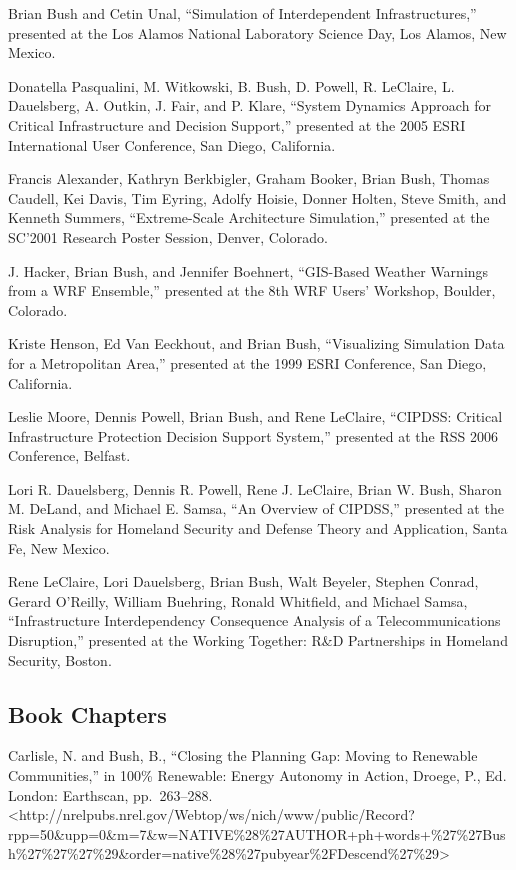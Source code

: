 \documentclass[]{article}
\begin{document}
Brian Bush and Cetin Unal, ``Simulation of Interdependent
Infrastructures,'' presented at the Los Alamos National Laboratory
Science Day, Los Alamos, New Mexico.

Donatella Pasqualini, M. Witkowski, B. Bush, D. Powell, R. LeClaire, L.
Dauelsberg, A. Outkin, J. Fair, and P. Klare, ``System Dynamics Approach
for Critical Infrastructure and Decision Support,'' presented at the
2005 ESRI International User Conference, San Diego, California.

Francis Alexander, Kathryn Berkbigler, Graham Booker, Brian Bush, Thomas
Caudell, Kei Davis, Tim Eyring, Adolfy Hoisie, Donner Holten, Steve
Smith, and Kenneth Summers, ``Extreme-Scale Architecture Simulation,''
presented at the SC'2001 Research Poster Session, Denver, Colorado.

J. Hacker, Brian Bush, and Jennifer Boehnert, ``GIS-Based Weather
Warnings from a WRF Ensemble,'' presented at the 8th WRF Users'
Workshop, Boulder, Colorado.

Kriste Henson, Ed Van Eeckhout, and Brian Bush, ``Visualizing Simulation
Data for a Metropolitan Area,'' presented at the 1999 ESRI Conference,
San Diego, California.

Leslie Moore, Dennis Powell, Brian Bush, and Rene LeClaire, ``CIPDSS:
Critical Infrastructure Protection Decision Support System,'' presented
at the RSS 2006 Conference, Belfast.

Lori R. Dauelsberg, Dennis R. Powell, Rene J. LeClaire, Brian W. Bush,
Sharon M. DeLand, and Michael E. Samsa, ``An Overview of CIPDSS,''
presented at the Risk Analysis for Homeland Security and Defense Theory
and Application, Santa Fe, New Mexico.

Rene LeClaire, Lori Dauelsberg, Brian Bush, Walt Beyeler, Stephen
Conrad, Gerard O'Reilly, William Buehring, Ronald Whitfield, and Michael
Samsa, ``Infrastructure Interdependency Consequence Analysis of a
Telecommunications Disruption,'' presented at the Working Together: R\&D
Partnerships in Homeland Security, Boston.

\subsection{Book Chapters}\label{book-chapters}

Carlisle, N. and Bush, B., ``Closing the Planning Gap: Moving to
Renewable Communities,'' in 100\% Renewable: Energy Autonomy in Action,
Droege, P., Ed. London: Earthscan, pp.~263--288.
\textless{}http://nrelpubs.nrel.gov/Webtop/ws/nich/www/public/Record?rpp=50\&upp=0\&m=7\&w=NATIVE\%28\%27AUTHOR+ph+words+\%27\%27Bush\%27\%27\%27\%29\&order=native\%28\%27pubyear\%2FDescend\%27\%29\textgreater{}
\end{document}
